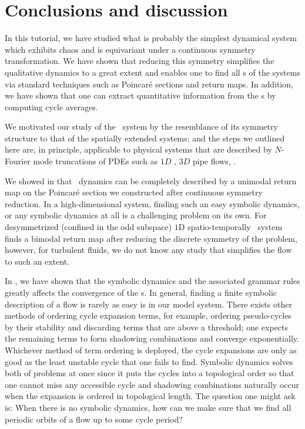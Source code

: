 \section{Conclusions and discussion}
\label{s:concl}

In this tutorial, we have studied what is probably the simplest dynamical system which
exhibits chaos and is equivariant under a continuous symmetry transformation.
We have shown that reducing this symmetry simplifies the qualitative dynamics
to a great extent and enables one to find all \rpo s of the systems via
standard techniques such as Poincar\'e sections and return maps. In
addition, we have shown that one can extract quantitative information
from the \rpo s by computing cycle averages.

We motivated our study of the \twomode\ system by the resemblance of its
symmetry structure to that of the spatially extended systems; and the steps we
outlined here are, in principle, applicable to physical systems that are
described by $N$-Fourier mode truncations of PDEs such as $1D$
\KS{}, $3D$ pipe flows, \etc.

We showed in  that \twomode\ dynamics can be completely
described by a unimodal return map on the Poincar\'e section we constructed
after continuous symmetry reduction. In a high-dimensional system, finding such
an easy symbolic dynamics, or any symbolic dynamics at all is a challenging
problem on its own. For desymmetrized (confined in the odd subspace) $1$D
spatio-temporally \KS\ system  finds a bimodal return map after
reducing the discrete symmetry of the problem, however, for turbulent fluids,
we do not know any study that simplifies the flow to such an extent.

In , we have shown that the symbolic dynamics and the
associated grammar rules greatly affects the convergence of the \cycForm s.
In general, finding a finite symbolic description of a flow is
rarely as easy is in our model system.
There exists other methods of ordering cycle
expansion terms, for example, ordering pseudo-cycles by their stability and discarding terms
that are above a threshold; one expects the remaining terms to form
shadowing combinations and converge exponentially.
Whichever method of term ordering is deployed, the cycle expansions are only as good
as the least unstable cycle that one fails to find. Symbolic dynamics solves both
of problems at once since it puts the cycles into a topological order so that
one cannot miss any accessible cycle and shadowing combinations naturally occur
when the expansion is ordered in topological length. The question one might ask
is: When there is no symbolic dynamics, how can we make sure that we find all
periodic orbits of a flow up to some cycle period?

